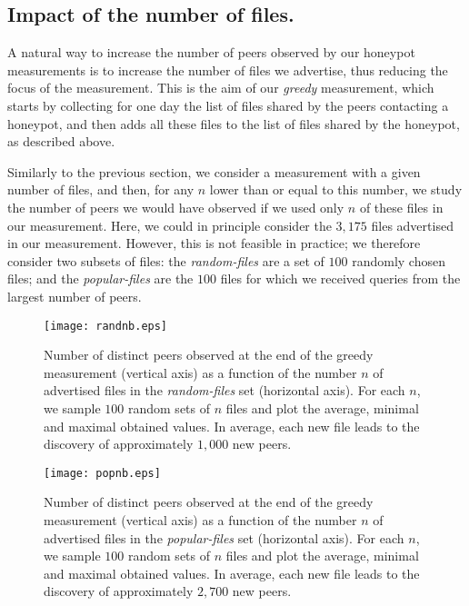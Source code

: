 \documentclass[final,
notitlepage,
narroweqnarray,
	inline,
	twoside,
]{ieee}
\begin{document}
\subsection{Impact of the number of files.}
\label{sec-nbfiles}

A natural way to increase the number of peers observed by our honeypot
measurements is to increase the number of files we advertise, thus
reducing the focus of the measurement. This is the aim of our {\em
  greedy} measurement, which starts by collecting for one day the list
of files shared by the peers contacting a honeypot, and then adds all
these files to the list of files shared by the honeypot, as described
above.

Similarly to the previous section, we consider a measurement with a given number of files, and then, for any $n$ lower than or equal to this number, we study the number of peers we would have observed if we used only $n$ of these files in our measurement. Here, we could in principle consider the $3,175$ files advertised in our measurement. However, this is not feasible in practice; we therefore consider two subsets of files: the {\em random-files} are a set of $100$ randomly chosen files; and the {\em popular-files} are the $100$ files for which we received queries from the largest number of peers.

\begin{figure}[h!]
\centering
\texttt{[image: randnb.eps]}
\caption{Number of distinct peers observed at the end of the greedy measurement (vertical axis) as a function of the number $n$ of advertised files in the {\em random-files} set (horizontal axis). For each $n$, we sample $100$ random sets of $n$ files and plot the average, minimal and maximal obtained values. In average, each new file leads to the discovery of approximately $1,000$ new peers.}
\label{fig-file-rand}
\end{figure}

\begin{figure}[h!]
\centering
\texttt{[image: popnb.eps]}
\caption{Number of distinct peers observed at the end of the greedy measurement (vertical axis) as a function of the number $n$ of advertised files in the {\em popular-files} set (horizontal axis). For each $n$, we sample $100$ random sets of $n$ files and plot the average, minimal and maximal obtained values. In average, each new file leads to the discovery of approximately $2,700$ new peers.} 
\label{fig-file-pop}
\end{figure}
\end{document}
